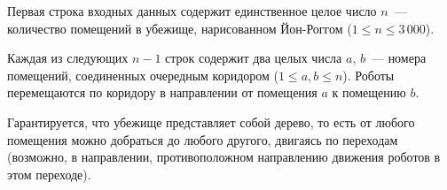 Первая строка входных данных содержит единственное целое число $n$~--- количество помещений в убежище, нарисованном Йон-Роггом ($1 \le n \le 3\,000$).

Каждая из следующих $n - 1$ строк содержит два целых числа $a$, $b$~--- номера помещений, соединенных очередным коридором ($1 \le a, b \le n$). Роботы перемещаются по коридору в направлении от помещения $a$ к помещению $b$.

Гарантируется, что убежище представляет собой дерево, то есть от любого помещения можно добраться до любого другого, двигаясь по переходам (возможно, в направлении, противоположном направлению движения роботов в этом переходе).